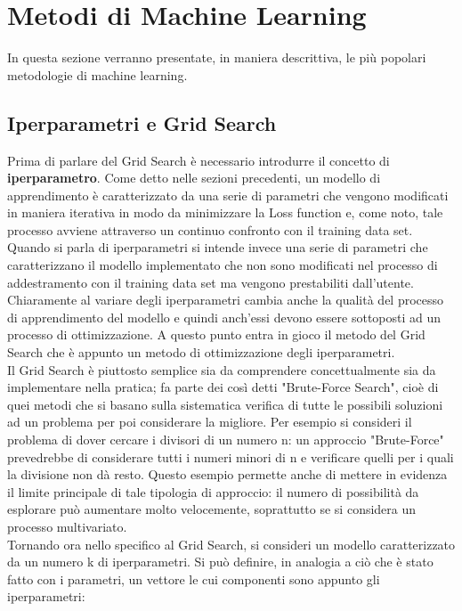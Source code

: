 %
\section{Metodi di Machine Learning}
\label{sec:metodi di machine learning}
%

In questa sezione verranno presentate, in maniera descrittiva, le più popolari metodologie di machine learning.\\

\subsection{Iperparametri e Grid Search}
\label{iperparametri e grid search}

Prima di parlare del Grid Search è necessario introdurre il concetto di \textbf{iperparametro}. Come detto nelle sezioni precedenti, un modello di apprendimento è caratterizzato da una serie di parametri che vengono modificati in maniera iterativa in modo da minimizzare la Loss function e, come noto, tale processo avviene attraverso un continuo confronto con il training data set. Quando si parla di iperparametri si intende invece una serie di parametri che caratterizzano il modello implementato che non sono modificati nel processo di addestramento con il training data set ma vengono prestabiliti dall'utente. \\
Chiaramente al variare degli iperparametri cambia anche la qualità del processo di apprendimento del modello e quindi anch'essi devono essere sottoposti ad un processo di ottimizzazione. A questo punto entra in gioco il metodo del Grid Search che è appunto un metodo di ottimizzazione degli iperparametri. \\
Il Grid Search è piuttosto semplice sia da comprendere concettualmente sia da implementare nella pratica; fa parte dei così detti "Brute-Force Search", cioè di quei metodi che si basano sulla sistematica verifica di tutte le possibili soluzioni ad un problema per poi considerare la migliore. Per esempio si consideri il problema di dover cercare i divisori di un numero n: un approccio "Brute-Force" prevedrebbe di considerare tutti i numeri minori di n e verificare quelli per i quali la divisione non dà resto. Questo esempio permette anche di mettere in evidenza il limite principale di tale tipologia di approccio: il numero di possibilità da esplorare può aumentare molto velocemente, soprattutto se si considera un processo multivariato. \\
Tornando ora nello specifico al Grid Search, si consideri un modello caratterizzato da un numero k di iperparametri. Si può definire, in analogia a ciò che è stato fatto con i parametri, un vettore le cui componenti sono appunto gli iperparametri: 
